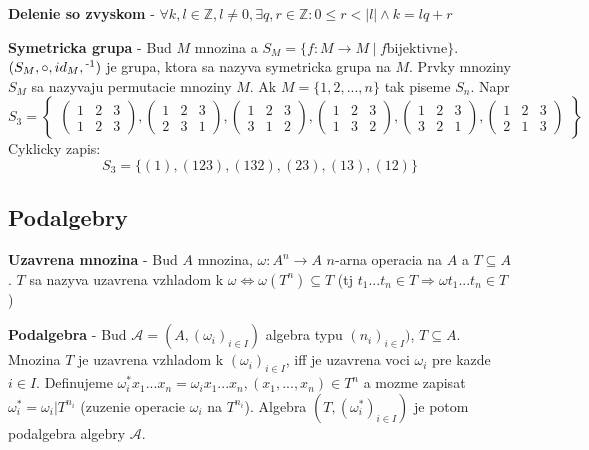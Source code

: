 \documentclass[12pt]{article}
\newcommand{\pipesep}{\hspace{3pt} \vert \hspace{3pt}}
\begin{document}
\textbf{Delenie so zvyskom} - $\forall k,l \in \mathbb{Z}, l \not= 0, \exists q,r \in \mathbb{Z}:
0 \le r < \vert l \vert \land k = lq + r$

\textbf{Symetricka grupa} - Bud $M$ mnozina a $S_{M} = \{ f : M \to M \pipesep f \text{bijektivne} \}$.
$(S_{M}, \circ, id_{M}, \textsuperscript{-1})$ je grupa, ktora sa nazyva symetricka grupa na $M$.
Prvky mnoziny $S_{M}$ sa nazyvaju permutacie mnoziny $M$. Ak $M = \{1,2,...,n\}$ tak piseme $S_{n}$. Napr
\begin{equation*}
	S_{3} = \begin{Bmatrix}
	\begin{pmatrix}
		1 & 2 & 3 \\
		1 & 2 & 3
	\end{pmatrix},
	\begin{pmatrix}
		1 & 2 & 3 \\
		2 & 3 & 1
	\end{pmatrix},
	\begin{pmatrix}
		1 & 2 & 3 \\
		3 & 1 & 2
	\end{pmatrix},
	\begin{pmatrix}
		1 & 2 & 3 \\
		1 & 3 & 2
	\end{pmatrix},
	\begin{pmatrix}
		1 & 2 & 3 \\
		3 & 2 & 1
	\end{pmatrix},
	\begin{pmatrix}
		1 & 2 & 3 \\
		2 & 1 & 3
	\end{pmatrix}
	\end{Bmatrix}
\end{equation*}
Cyklicky zapis:
\begin{equation*}
	S_{3} = \{ (1), (123), (132), (23), (13), (12) \}
\end{equation*}
\subsection{Podalgebry}
\textbf{Uzavrena mnozina} - Bud $A$ mnozina, $\omega: A^{n} \to A$ $n$-arna operacia na $A$ a $T \subseteq A$.
$T$ sa nazyva uzavrena vzhladom k $\omega \Leftrightarrow \omega(T^{n}) \subseteq T$
(tj $t_{1}...t_{n} \in T \Rightarrow \omega t_{1}...t_{n} \in T$)

\textbf{Podalgebra} - Bud $\mathcal{A} = (A,(\omega_{i})_{i \in I})$ algebra typu $(n_{i})_{i \in I})$, $T \subseteq A$.
Mnozina $T$ je uzavrena vzhladom k $(\omega_{i})_{i \in I}$, iff je uzavrena voci $\omega_{i}$ pre kazde $i \in I$.
Definujeme $\omega^{*}_{i}x_{1}...x_{n} = \omega_{i}x_{1}...x_{n}, (x_{1},...,x_{n}) \in T^{n}$ a mozme zapisat
$\omega^{*}_{i} = \omega_{i} \vert T^{n_{i}}$ (zuzenie operacie $\omega_{i}$ na $T^{n_{i}}$).
Algebra $(T,(\omega^{*}_{i})_{i \in I})$ je potom podalgebra algebry $\mathcal{A}$.
\end{document}
